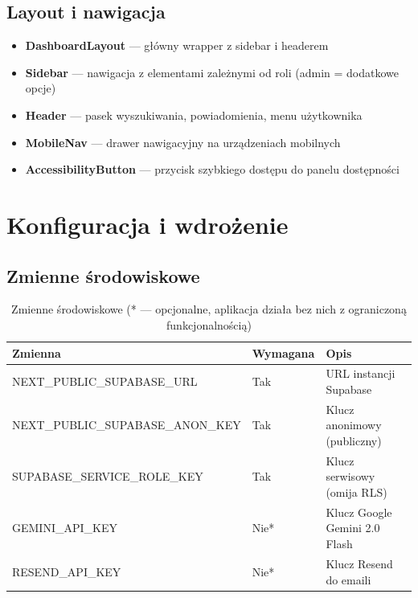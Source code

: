 \documentclass[12pt,a4paper]{article}
\begin{document}
\subsection{Layout i nawigacja}

\begin{itemize}[leftmargin=2em]
  \item \textbf{DashboardLayout} — główny wrapper z sidebar i headerem
  \item \textbf{Sidebar} — nawigacja z elementami zależnymi od roli (admin = dodatkowe opcje)
  \item \textbf{Header} — pasek wyszukiwania, powiadomienia, menu użytkownika
  \item \textbf{MobileNav} — drawer nawigacyjny na urządzeniach mobilnych
  \item \textbf{AccessibilityButton} — przycisk szybkiego dostępu do panelu dostępności
\end{itemize}

\newpage

\section{Konfiguracja i wdrożenie}

\subsection{Zmienne środowiskowe}

\begin{table}[H]
\centering
\renewcommand{\arraystretch}{1.3}
\begin{tabularx}{\textwidth}{l l X}
\toprule
\textbf{Zmienna} & \textbf{Wymagana} & \textbf{Opis} \\
\midrule
NEXT\_PUBLIC\_SUPABASE\_URL & Tak & URL instancji Supabase \\
NEXT\_PUBLIC\_SUPABASE\_ANON\_KEY & Tak & Klucz anonimowy (publiczny) \\
SUPABASE\_SERVICE\_ROLE\_KEY & Tak & Klucz serwisowy (omija RLS) \\
GEMINI\_API\_KEY & Nie* & Klucz Google Gemini 2.0 Flash \\
RESEND\_API\_KEY & Nie* & Klucz Resend do emaili \\
\bottomrule
\end{tabularx}
\caption{Zmienne środowiskowe (* — opcjonalne, aplikacja działa bez nich z ograniczoną funkcjonalnością)}
\end{table}
\end{document}
